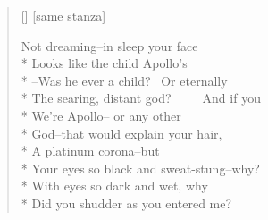 \begin{verse}[\versewidth]
[same stanza]

Not dreaming--in sleep your face\\*
Looks like the child Apollo's\\*
--Was he ever a child?  Or eternally\\*
The searing, distant god?      And if you\\*
We're Apollo-- or any other\\*
God--that would explain your hair,\\*
A platinum corona--but\\*
Your eyes so black and sweat-stung--why?\\*
With eyes so dark and wet, why\\*
Did you shudder as you entered me?
\end{verse}
